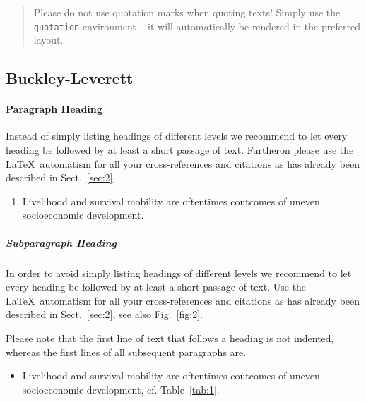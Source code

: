\begin{quotation}
    Please do not use quotation marks when quoting texts! Simply use the \verb|quotation| environment -- it will automatically be rendered in the preferred layout.
\end{quotation}

\subsection{Buckley-Leverett}

\paragraph{Paragraph Heading} %
Instead of simply listing headings of different levels we recommend to let every heading be followed by at least a short passage of text. Furtheron please use the \LaTeX\ automatism for all your cross-references and citations as has already been described in Sect.~\ref{sec:2}.

\begin{enumerate}
    \item{Livelihood and survival mobility are oftentimes coutcomes of uneven socioeconomic development.}
\end{enumerate}


\subparagraph{Subparagraph Heading} In order to avoid simply listing headings of different levels we recommend to let every heading be followed by at least a short passage of text. Use the \LaTeX\ automatism for all your cross-references and citations as has already been described in Sect.~\ref{sec:2}, see also Fig.~\ref{fig:2}.

Please note that the first line of text that follows a heading is not indented, whereas the first lines of all subsequent paragraphs are.

\begin{itemize}
    \item{Livelihood and survival mobility are oftentimes coutcomes of uneven socioeconomic development, cf. Table~\ref{tab:1}.}
\end{itemize}

